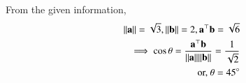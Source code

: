 From the given information,
\begin{align}
\lVert\mathbf{a}\rVert=\sqrt{3},
\lVert\mathbf{b}\rVert= 2,
{\mathbf{a}^{\top}}{\mathbf{b}}=\sqrt{6}  
\\
\implies \cos\theta=\frac{{\mathbf{a}^{\top}}{\mathbf{b}}}{\lVert\mathbf{a}\rVert\lVert\mathbf{b}\rVert}
=\frac{1}{\sqrt{2}}\\
	\text{or, }\theta={45}\degree
\end{align}
